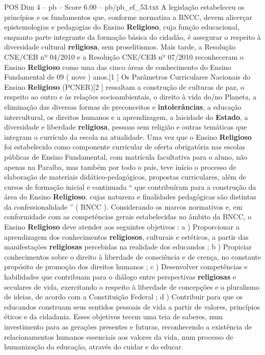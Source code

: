 \begin{textsample}{POS Dim 4 – pb – Score 6.00 – pb/pb\_ef\_53.txt}
A legislação estabeleceu os princípios e os fundamentos que, conforme normatiza a BNCC, devem alicerçar epistemologias e pedagogias do Ensino \textbf{Religioso}, cuja função educacional, enquanto parte integrante da formação básica do cidadão, é assegurar o respeito à diversidade cultural \textbf{religiosa}, sem proselitismos.
Mais tarde, a Resolução CNE/CEB nº 04/2010 e a Resolução CNE/CEB nº 07/2010 reconheceram o Ensino \textbf{Religioso} como uma das cinco áreas de conhecimento do Ensino Fundamental de 09 ( nove ) anos.[1 ] Os Parâmetros Curriculares Nacionais do Ensino \textbf{Religioso} (PCNER)[2 ] ressaltam a construção de culturas de paz, o respeito ao outro e às relações socioambientais, o direito à vida do/no Planeta, a eliminação das diversas formas de preconceitos e \textbf{intolerâncias}, a educação intercultural, os direitos humanos e a aprendizagem, a laicidade do \textbf{Estado}, a diversidade e liberdade \textbf{religiosa}, pessoas sem religião e outras temáticas que integram o currículo da escola na atualidade.
Uma vez que o Ensino \textbf{Religioso} foi estabelecido como componente curricular de oferta obrigatória nas escolas públicas de Ensino Fundamental, com matrícula facultativa para o aluno, não apenas na Paraíba, mas também por todo o país, teve início o processo de elaboração de materiais didático-pedagógicos, propostas curriculares, além de cursos de formação inicial e continuada “ que contribuíram para a construção da área do Ensino \textbf{Religioso}, cujas natureza e finalidades pedagógicas são distintas da confessionalidade ” ( BNCC ).
Considerando os marcos normativos e, em conformidade com as competências gerais estabelecidas no âmbito da BNCC, o Ensino \textbf{Religioso} deve atender aos seguintes objetivos : a ) Proporcionar a aprendizagem dos conhecimentos \textbf{religiosos}, culturais e estéticos, a partir das manifestações \textbf{religiosas} percebidas na realidade dos educandos ; b ) Propiciar conhecimentos sobre o direito à liberdade de consciência e de crença, no constante propósito de promoção dos direitos humanos ; c ) Desenvolver competências e habilidades que contribuam para o diálogo entre perspectivas \textbf{religiosas} e seculares de vida, exercitando o respeito à liberdade de concepções e o pluralismo de ideias, de acordo com a Constituição Federal ; d ) Contribuir para que os educandos construam seus sentidos pessoais de vida a partir de valores, princípios éticos e da cidadania.
Esses objetivos tecem uma teia de saberes, num investimento para as gerações presentes e futuras, reconhecendo a existência de relacionamentos humanos essenciais aos valores da vida, num processo de humanização da educação, através do cuidar e do educar.

\end{textsample}
